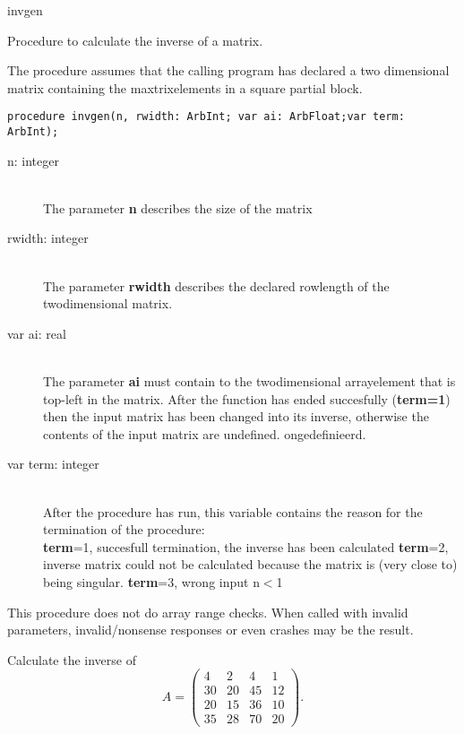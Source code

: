 \documentclass{report}
\newcommand{\FunctionDescription}{\item[Description]\rmfamily}
\newcommand{\Dataorganisation}{\item[Data Struct]\rmfamily}
\newcommand{\DeclarationandParams}{\item[Declaration]\rmfamily}
\newcommand{\Remarks}{\item[Remarks]\rmfamily}
\newcommand{\Example}{\item[Example]\rmfamily}
\begin{document}
\begin{procedure}{invgen}

\FunctionDescription

Procedure to calculate the inverse of a matrix.

\Dataorganisation

The procedure assumes that the calling program has declared a two dimensional
matrix containing the maxtrixelements in a square partial block.

\DeclarationandParams

\lstinline|procedure invgen(n, rwidth: ArbInt; var ai: ArbFloat;var term: ArbInt);|

\begin{description}
 \item[n: integer] \mbox{ } \\
    The parameter {\bf n} describes the size of the matrix
 \item[rwidth: integer] \mbox{} \\
    The parameter {\bf rwidth} describes the declared rowlength of the twodimensional
    matrix.
 \item[var ai: real] \mbox{} \\
    The parameter {\bf ai} must contain to the twodimensional arrayelement
    that is top-left in the matrix.
    After the function has ended succesfully (\textbf{term=1}) then 
    the input matrix has been changed into its inverse, otherwise the contents 
    of the input matrix are undefined.
    ongedefinieerd.
 \item[var term: integer]  \mbox{} \\
    After the procedure has run, this variable contains the reason for 
    the termination of the procedure:\\
      {\bf term}=1, succesfull termination, the inverse has been calculated
      {\bf term}=2, inverse matrix could not be calculated because the matrix
		    is (very close to) being singular.
      {\bf term}=3, wrong input n$<$1
\end{description}
\Remarks
  This procedure does not do array range checks. When called with invalid
  parameters, invalid/nonsense responses or even crashes may be the result.

\Example

Calculate the inverse of 
\[
 A=
 \left(
 \begin{array}{rrrr}
   4 & 2 & 4 & 1  \\
  30 & 20 & 45 & 12 \\
  20 & 15 & 36 & 10 \\
  35 & 28 & 70 & 20
 \end{array}
 \right)
 .
\]


\end{procedure}
\end{document}

